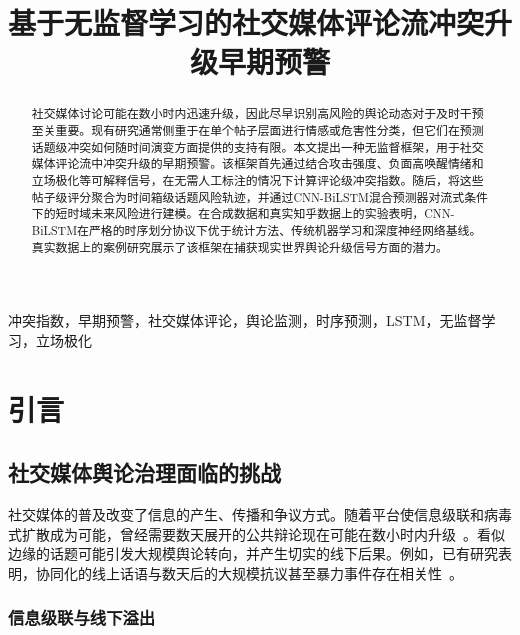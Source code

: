 \documentclass[conference]{IEEEtran}
\begin{document}
\title{基于无监督学习的社交媒体评论流冲突升级早期预警}

\author{
}
\maketitle

\begin{abstract}
社交媒体讨论可能在数小时内迅速升级，因此尽早识别高风险的舆论动态对于及时干预至关重要。现有研究通常侧重于在单个帖子层面进行情感或危害性分类，但它们在预测话题级冲突如何随时间演变方面提供的支持有限。本文提出一种无监督框架，用于社交媒体评论流中冲突升级的早期预警。该框架首先通过结合攻击强度、负面高唤醒情绪和立场极化等可解释信号，在无需人工标注的情况下计算评论级冲突指数。随后，将这些帖子级评分聚合为时间箱级话题风险轨迹，并通过CNN-BiLSTM混合预测器对流式条件下的短时域未来风险进行建模。在合成数据和真实知乎数据上的实验表明，CNN-BiLSTM在严格的时序划分协议下优于统计方法、传统机器学习和深度神经网络基线。真实数据上的案例研究展示了该框架在捕获现实世界舆论升级信号方面的潜力。
\end{abstract}

\begin{IEEEkeywords}
冲突指数，早期预警，社交媒体评论，舆论监测，时序预测，LSTM，无监督学习，立场极化
\end{IEEEkeywords}

\section{引言}

\subsection{社交媒体舆论治理面临的挑战}

社交媒体的普及改变了信息的产生、传播和争议方式。随着平台使信息级联和病毒式扩散成为可能，曾经需要数天展开的公共辩论现在可能在数小时内升级~\cite{Vosoughi2018}。看似边缘的话题可能引发大规模舆论转向，并产生切实的线下后果。例如，已有研究表明，协同化的线上话语与数天后的大规模抗议甚至暴力事件存在相关性~\cite{Steinert2015,Arcila2024}。

\subsubsection{信息级联与线下溢出}
\end{document}
